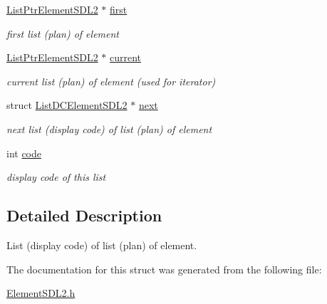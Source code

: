 \begin{DoxyCompactItemize}
\item 
\hyperlink{structListPtrElementSDL2}{List\+Ptr\+Element\+S\+D\+L2} $\ast$ \hyperlink{structListDCElementSDL2_a4226f765c0678e4e7cb79638eac95f35}{first}\hypertarget{structListDCElementSDL2_a4226f765c0678e4e7cb79638eac95f35}{}\label{structListDCElementSDL2_a4226f765c0678e4e7cb79638eac95f35}

\begin{DoxyCompactList}\small\item\em first list (plan) of element \end{DoxyCompactList}\item 
\hyperlink{structListPtrElementSDL2}{List\+Ptr\+Element\+S\+D\+L2} $\ast$ \hyperlink{structListDCElementSDL2_a1e39f2362d4eb953baec5eeaa7d6d8fd}{current}\hypertarget{structListDCElementSDL2_a1e39f2362d4eb953baec5eeaa7d6d8fd}{}\label{structListDCElementSDL2_a1e39f2362d4eb953baec5eeaa7d6d8fd}

\begin{DoxyCompactList}\small\item\em current list (plan) of element (used for iterator) \end{DoxyCompactList}\item 
struct \hyperlink{structListDCElementSDL2}{List\+D\+C\+Element\+S\+D\+L2} $\ast$ \hyperlink{structListDCElementSDL2_a4b3b553c3ea6251594c4ab955da356a5}{next}\hypertarget{structListDCElementSDL2_a4b3b553c3ea6251594c4ab955da356a5}{}\label{structListDCElementSDL2_a4b3b553c3ea6251594c4ab955da356a5}

\begin{DoxyCompactList}\small\item\em next list (display code) of list (plan) of element \end{DoxyCompactList}\item 
int \hyperlink{structListDCElementSDL2_a163353bf8dd3530a525f51abd703be1d}{code}\hypertarget{structListDCElementSDL2_a163353bf8dd3530a525f51abd703be1d}{}\label{structListDCElementSDL2_a163353bf8dd3530a525f51abd703be1d}

\begin{DoxyCompactList}\small\item\em display code of this list \end{DoxyCompactList}\end{DoxyCompactItemize}


\subsection{Detailed Description}
List (display code) of list (plan) of element. 

The documentation for this struct was generated from the following file\+:\begin{DoxyCompactItemize}
\item 
\hyperlink{ElementSDL2_8h}{Element\+S\+D\+L2.\+h}\end{DoxyCompactItemize}

